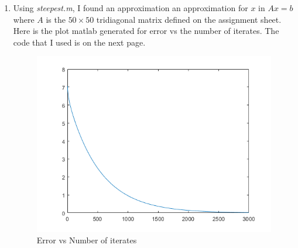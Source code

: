 \documentclass[11pt]{article}
\begin{document}
\begin{exercise}{2}
{\begin{enumerate}[label=\alph*)]
            $$ \alpha _0 = \dfrac{\boldr_0^T \boldr_0}{\boldr_0^T A \boldr_0} = \dfrac{\rnaughtT \rnaught}{\rnaughtT \matA \rnaught} = \dfrac{1 + 4}{\rnaughtT \begin{pmatrix} -5/2 \\ -5/4 \end{pmatrix}} = \dfrac{5}{5/2 + 5/2} = 5/5 = 1 $$
            $$ \boldx_1 = \boldx_0 - \alpha _0 \boldr_0 = \xnaught - 1 \rnaught = \vectorb $$
            $$ \boldr_1 = A \boldx_1 - \boldb = \matA \xone - \vectorb = \begin{pmatrix} 5/2 \\ 5/4 \end{pmatrix} - \vectorb = \rone $$
            $$ \alpha _1 = \dfrac{\boldr_1^T \boldr_1}{\boldr_1^T A \boldr_1} = \dfrac{\roneT \rone}{\roneT \matA \rone} = \dfrac{9/4 + 9/16}{\roneT \begin{pmatrix} 45/16 \\ 0 \end{pmatrix}} = \dfrac{45/16}{3/2 * 45/16} = 2/3 $$
            $$ \boldx_2 = \boldx_1 - \alpha _1 \boldr_1 = \xone - 2/3 \rone = \xone - \begin{pmatrix} 1 \\ -1/2 \end{pmatrix} = \xtwo $$ \newpage
            \item Using \textit{steepest.m}, I found an approximation an approximation for $x$ in $Ax = b$ where $A$ is the $50 \times 50$ tridiagonal matrix defined on the assignment sheet.
            Here is the plot matlab generated for error vs the number of iterates.
            The code that I used is on the next page.
            \begin{figure}[h]
                \begin{center}
                    \includegraphics[scale=1]{plot}
                    \caption{Error vs Number of iterates}
                    \label{fig:plot}
                \end{center}
            \end{figure}
        \end{enumerate}
    }
\end{exercise}
\end{document}

